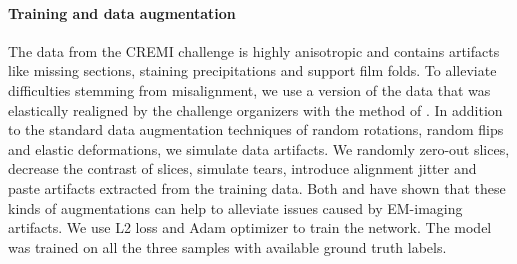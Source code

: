 \paragraph{Training and data augmentation} The data from the CREMI challenge is highly anisotropic and contains artifacts like missing sections, staining precipitations and support film folds. 
To alleviate difficulties stemming from misalignment, we use a version of the data that was elastically realigned by the challenge organizers with the method of \cite{saalfeld2012elastic}.
In addition to the standard data augmentation techniques of random rotations, random flips and  elastic deformations, we simulate data artifacts.
We randomly zero-out slices, decrease the contrast of slices, simulate tears, introduce alignment jitter and paste artifacts extracted from the training data. Both \cite{funke2018large} and \cite{lee2017superhuman} have shown
that these kinds of augmentations can help to alleviate issues caused by EM-imaging artifacts.
We use L2 loss and Adam optimizer to train the network. The model was trained on all the three samples with available ground truth labels.  

